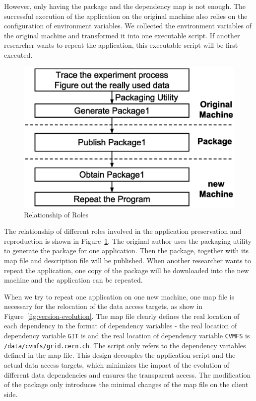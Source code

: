 \documentclass{sig-alternate}
\begin{document}
However, only having the package and the dependency map is not enough. The successful execution of the application on the original machine also relies on the configuration of environment variables.
We collected the environment variables of the original machine and transformed it into one executable script. If another researcher wants to repeat the application, this executable script will be first executed. 

\begin{figure}
\centering
\includegraphics[width=.8\columnwidth]{solution3.eps}
\caption{Relationship of Roles}
\label{fig:solution3}
\end{figure}

The relationship of different roles involved in the application preservation and
reproduction is shown in Figure~\ref{fig:solution3}.  The original author uses the packaging utility to generate the package for one application.
Then the package, together with
its map file and description file will be published. When
another researcher wants to repeat the application, one copy of the package will be downloaded into the new machine and the application can be repeated.

When we try to repeat one application on one new machine, one map file is necessary for the relocation of the data access targets, as
show in Figure~\ref{fig:version-evolution}. 
The map file clearly defines the real location of each dependency in the format of dependency variables - the real location of dependency variable {\tt GIT} is  and the real location of dependency variable {\tt CVMFS}
is {\tt /data/cvmfs/grid.cern.ch}.
The script only refers to the dependency variables defined in the map file.
This design decouples the application script and the actual data access targets, which minimizes the impact of the evolution of different data dependencies
and ensures the transparent access.
The modification of the package only introduces the minimal changes of the map file on the client side.
\end{document}
